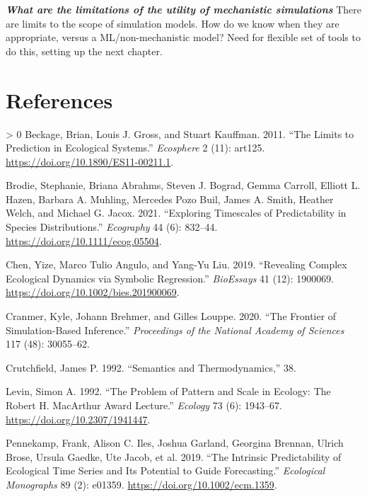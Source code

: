 \documentclass[10pt,oneside]{article}
\newlength{\cslhangindent}
\newenvironment{CSLReferences}[3] %
 {%
  \setlength{\parindent}{0pt}
  \ifodd #1 \everypar{\setlength{\hangindent}{\cslhangindent}}\ignorespaces\fi
  \ifnum #2 > 0
  \setlength{\parskip}{#2\baselineskip}
  \fi
 }%
 {}
\begin{document}
\textbf{\emph{What are the limitations of the utility of mechanistic
simulations}} There are limits to the scope of simulation models. How do
we know when they are appropriate, versus a ML/non-mechanistic model?
Need for flexible set of tools to do this, setting up the next chapter.

\hypertarget{references}{%
\section*{References}\label{references}}

\hypertarget{refs}{}
\begin{CSLReferences}{1}{0}
\leavevmode\hypertarget{ref-Beckage2011LimPre}{}%
Beckage, Brian, Louis J. Gross, and Stuart Kauffman. 2011. {``The Limits
to Prediction in Ecological Systems.''} \emph{Ecosphere} 2 (11): art125.
\url{https://doi.org/10.1890/ES11-00211.1}.

\leavevmode\hypertarget{ref-Brodie2021ExpTim}{}%
Brodie, Stephanie, Briana Abrahms, Steven J. Bograd, Gemma Carroll,
Elliott L. Hazen, Barbara A. Muhling, Mercedes Pozo Buil, James A.
Smith, Heather Welch, and Michael G. Jacox. 2021. {``Exploring
Timescales of Predictability in Species Distributions.''}
\emph{Ecography} 44 (6): 832--44.
\url{https://doi.org/10.1111/ecog.05504}.

\leavevmode\hypertarget{ref-Chen2019RevCom}{}%
Chen, Yize, Marco Tulio Angulo, and Yang-Yu Liu. 2019. {``Revealing
Complex Ecological Dynamics via Symbolic Regression.''} \emph{BioEssays}
41 (12): 1900069. \url{https://doi.org/10.1002/bies.201900069}.

\leavevmode\hypertarget{ref-Cranmer2020FroSim}{}%
Cranmer, Kyle, Johann Brehmer, and Gilles Louppe. 2020. {``The Frontier
of Simulation-Based Inference.''} \emph{Proceedings of the National
Academy of Sciences} 117 (48): 30055--62.

\leavevmode\hypertarget{ref-Crutchfield1992SemThe}{}%
Crutchfield, James P. 1992. {``Semantics and Thermodynamics,''} 38.

\leavevmode\hypertarget{ref-Levin1992ProPat}{}%
Levin, Simon A. 1992. {``The Problem of Pattern and Scale in Ecology:
The Robert H. MacArthur Award Lecture.''} \emph{Ecology} 73 (6):
1943--67. \url{https://doi.org/10.2307/1941447}.

\leavevmode\hypertarget{ref-Pennekamp2019IntPre}{}%
Pennekamp, Frank, Alison C. Iles, Joshua Garland, Georgina Brennan,
Ulrich Brose, Ursula Gaedke, Ute Jacob, et al. 2019. {``The Intrinsic
Predictability of Ecological Time Series and Its Potential to Guide
Forecasting.''} \emph{Ecological Monographs} 89 (2): e01359.
\url{https://doi.org/10.1002/ecm.1359}.


\end{CSLReferences}
\end{document}
